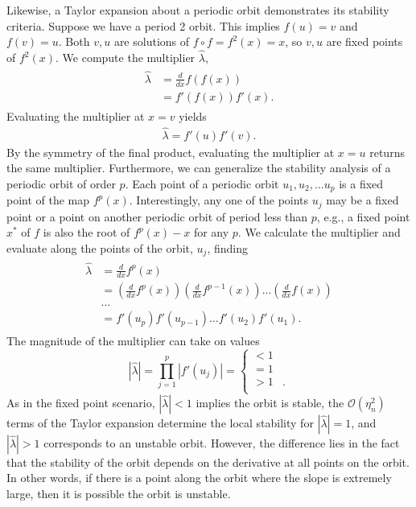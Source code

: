 Likewise, a Taylor expansion about a periodic orbit demonstrates its
stability criteria. Suppose we have a period 2 orbit. This implies
$f(u)=v$ and $f(v)=u$. Both $v,u$ are solutions of $f \circ
f= f^2(x) = x$, so $v,u$ are fixed points of $f^2(x)$. We compute the
multiplier $\hat{\lambda}$,
\begin{align*}
\begin{split}
\hat{\lambda} &= \frac{d}{dx} f(f(x)) \\
&= f'(f(x))f'(x).
\end{split}
\end{align*}
Evaluating the multiplier at $x=v$ yields
\begin{align*}
\hat{\lambda} = f'(u)f'(v).
\end{align*}
By the symmetry of the final product, evaluating the multiplier at
$x=u$ returns the same multiplier. Furthermore, we can generalize the
stability analysis of a periodic orbit of order $p$. Each point of a
periodic orbit $u_1,u_2,...u_p$ is a fixed point of the map
$f^p(x)$. Interestingly, any one of the points $u_j$ may be a fixed point or a point
on another periodic orbit of period less than $p$, e.g., a fixed
point $x^*$ of $f$ is also the root of $f^p(x)-x$ for any $p$. We
calculate the multiplier and evaluate along the points of the orbit,
$u_j$, finding
\begin{align*}
\begin{split}
\hat{\lambda} &= \frac{d}{dx} f^p(x) \\
&= \left(\frac{d}{dx} f^p(x)\right) \left(\frac{d}{dx} f^{p-1}(x)\right) ... \left(\frac{d}{dx} f(x)\right)\\
&...\\
&= f'(u_p)f'(u_{p-1})...f'(u_{2})f'(u_{1}).
\end{split}
\end{align*}
The magnitude of the multiplier can take on values
\begin{displaymath}
|\hat{\lambda}| =  \prod_{j = 1}^{p}|f'(u_j)| =\left\{
     \begin{array}{lr}
       <1 & \\
       =1 & \\
       >1 & .\\
     \end{array}
   \right.
\end{displaymath} 
As in the fixed point scenario, $|\hat{\lambda}|<1$ implies the orbit
is stable, the $\mathcal{O}(\eta_n^2)$ terms of the Taylor
expansion determine the local stability for $|\hat{\lambda}|=1$, and $|\hat{\lambda}|>1$ corresponds to an unstable
orbit. However, the difference lies in the fact that the
stability of the orbit depends on the derivative at all points on the
orbit. In other words, if there is a point along the orbit where the
slope is extremely large, then it is possible the orbit is unstable. 

